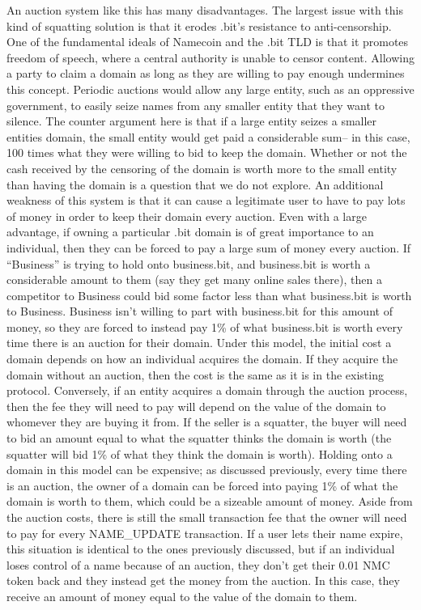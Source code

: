     An auction system like this has many disadvantages. The largest issue with this kind of squatting solution is that it erodes .bit's resistance to anti-censorship. One of the fundamental ideals of Namecoin and the .bit TLD is that it promotes freedom of speech, where a central authority is unable to censor content. Allowing a party to claim a domain as long as they are willing to pay enough undermines this concept. Periodic auctions would allow any large entity, such as an oppressive government, to easily seize names from any smaller entity that they want to silence. The counter argument here is that if a large entity seizes a smaller entities domain, the small entity would get paid a considerable sum-- in this case, 100 times what they were willing to bid to keep the domain. Whether or not the cash received by the censoring of the domain is worth more to the small entity than having the domain is a question that we do not explore.  An additional weakness of this system is that it can cause a legitimate user to have to pay lots of money in order to keep their domain every auction. Even with a large advantage, if owning a particular .bit domain is of great importance to an individual, then they can be forced to pay a large sum of money every auction. If “Business” is trying to hold onto business.bit, and business.bit is worth a considerable amount to them (say they get many online sales there), then a competitor to Business could bid some factor  less than what business.bit is worth to Business. Business isn't willing to part with business.bit for this amount of money, so they are forced to instead pay 1\% of what business.bit is worth every time there is an auction for their domain.
    Under this model, the initial cost a domain depends on how an individual acquires the domain. If they acquire the domain without an auction, then the cost is the same as it is in the existing protocol. Conversely, if an entity acquires a domain through the auction process, then the fee they will need to pay will depend on the value of the domain to whomever they are buying it from. If the seller is a squatter, the buyer will need to bid an amount equal to what the squatter thinks the domain is worth (the squatter will bid 1\% of what they think the domain is worth). Holding onto a domain in this model can be expensive; as discussed previously, every time there is an auction, the owner of a domain can be forced into paying 1\% of what the domain is worth to them, which could be a sizeable amount of money. Aside from the auction costs, there is still the small transaction fee that the owner will need to pay for every NAME\_UPDATE transaction. If a user lets their name expire, this situation is identical to the ones previously discussed, but if an individual loses control of a name because of an auction, they don't get their 0.01 NMC token back and they instead get the money from the auction. In this case, they receive an amount of money equal to the value of the domain to them. 

